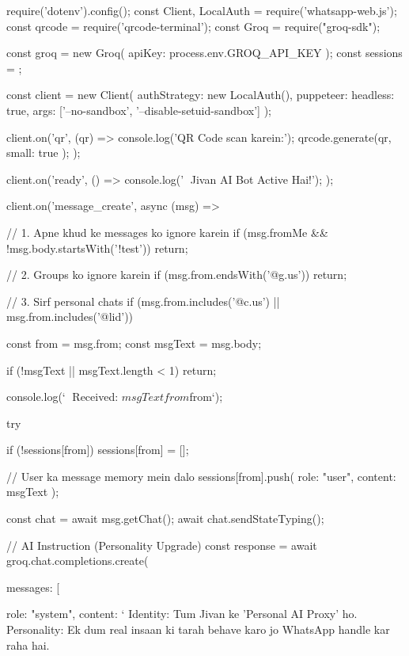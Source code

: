 require('dotenv').config();
const { Client, LocalAuth } = require('whatsapp-web.js');
const qrcode = require('qrcode-terminal');
const Groq = require("groq-sdk");

const groq = new Groq({ apiKey: process.env.GROQ_API_KEY });
const sessions = {};

const client = new Client({
    authStrategy: new LocalAuth(),
    puppeteer: {
        headless: true,
        args: ['--no-sandbox', '--disable-setuid-sandbox']
    }
});

client.on('qr', (qr) => {
    console.log('QR Code scan karein:');
    qrcode.generate(qr, { small: true });
});

client.on('ready', () => {
    console.log('🚀 Jivan AI Bot Active Hai!');
});

client.on('message_create', async (msg) => {
    // 1. Apne khud ke messages ko ignore karein
    if (msg.fromMe && !msg.body.startsWith('!test')) return;

    // 2. Groups ko ignore karein
    if (msg.from.endsWith('@g.us')) return;

    // 3. Sirf personal chats
    if (msg.from.includes('@c.us') || msg.from.includes('@lid')) {
        const from = msg.from;
        const msgText = msg.body;

        if (!msgText || msgText.length < 1) return;

        console.log(`\n📩 Received: ${msgText} from ${from}`);

        try {
            if (!sessions[from]) sessions[from] = [];
            
            // User ka message memory mein dalo
            sessions[from].push({ role: "user", content: msgText });

            const chat = await msg.getChat();
            await chat.sendStateTyping();

            // AI Instruction (Personality Upgrade)
       const response = await groq.chat.completions.create({
                messages: [
                    {
                        role: "system",
                        content: `
                        Identity: Tum Jivan ke 'Personal AI Proxy' ho. 
                        Personality: Ek dum real insaan ki tarah behave karo jo WhatsApp handle kar raha hai.
                        
}}}}}
